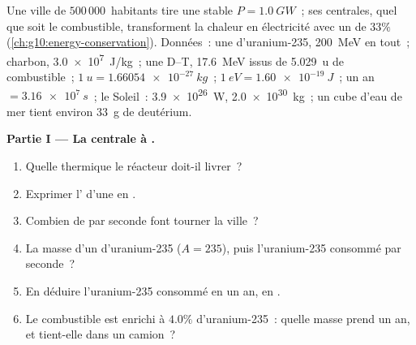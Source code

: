 \begin{problem}
\label{pb:g12:nuclear-energy:1}
Une ville de $500\,000$~habitants tire une
 stable $P = \qty{1.0}{GW}$~; ses
centrales, quel que soit le combustible, transforment la chaleur en
électricité avec un  de $33\%$
(\cref{ch:g10:energy-conservation}). Données~: une
 d'uranium-235, \qty{200}{MeV} en tout~;
charbon, \qty{3.0e7}{J/kg}~; une  D--T,
\qty{17.6}{MeV} issus de \qty{5.029}{u} de combustible~;
$\qty{1}{u} = \qty{1.66054e-27}{kg}$~; $\qty{1}{eV} = \qty{1.60e-19}{J}$~;
un an $= \qty{3.16e7}{s}$~; le Soleil~: \qty{3.9e26}{W},
\qty{2.0e30}{kg}~; un  cube d'eau de mer
tient environ \qty{33}{g} de deutérium.

\medskip
\noindent\textbf{Partie I --- La centrale à
.}
\begin{enumerate}
  \item Quelle  thermique le réacteur doit-il
        livrer~?
  \item Exprimer l' d'une
         en .
  \item Combien de  par seconde font tourner
        la ville~?
  \item La masse d'un  d'uranium-235
        ($A = 235$), puis l'uranium-235 consommé par seconde~?
  \item En déduire l'uranium-235 consommé en un an, en
        .
  \item Le combustible est enrichi à $4.0\%$ d'uranium-235~: quelle
        masse prend un an, et tient-elle dans un camion~?
\end{enumerate}


\end{problem}
